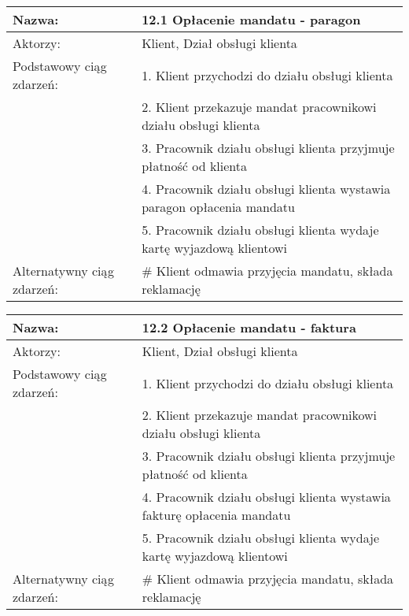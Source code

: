 \begin{center}
\begin{tabular}{|L{3cm}  L{13cm}|}
\hline
Nazwa: & 12.1 Opłacenie mandatu - paragon\\ \hline
Aktorzy: & Klient,  Dział obsługi klienta \\ \hline
Podstawowy ciąg zdarzeń: & 1. Klient przychodzi do działu obsługi klienta \\
 & 2. Klient przekazuje mandat pracownikowi działu obsługi klienta \\
 & 3. Pracownik działu obsługi klienta przyjmuje płatność od klienta \\
 & 4. Pracownik działu obsługi klienta wystawia paragon opłacenia mandatu \\
 & 5. Pracownik działu obsługi klienta wydaje kartę wyjazdową klientowi \\
 \hline
Alternatywny ciąg zdarzeń:  & \# Klient odmawia przyjęcia mandatu, składa reklamację \\ 
 \hline
\end{tabular}

\vspace{1cm}

\begin{tabular}{|L{3cm}  L{13cm}|}
\hline
Nazwa: & 12.2 Opłacenie mandatu - faktura\\ \hline
Aktorzy: & Klient,  Dział obsługi klienta \\ \hline
Podstawowy ciąg zdarzeń: & 1. Klient przychodzi do działu obsługi klienta \\
 & 2. Klient przekazuje mandat pracownikowi działu obsługi klienta \\
 & 3. Pracownik działu obsługi klienta przyjmuje płatność od klienta \\
 & 4. Pracownik działu obsługi klienta wystawia fakturę opłacenia mandatu \\
 & 5. Pracownik działu obsługi klienta wydaje kartę wyjazdową klientowi \\
 \hline
Alternatywny ciąg zdarzeń:  & \# Klient odmawia przyjęcia mandatu, składa reklamację \\ 
 \hline
\end{tabular}
\end{center}